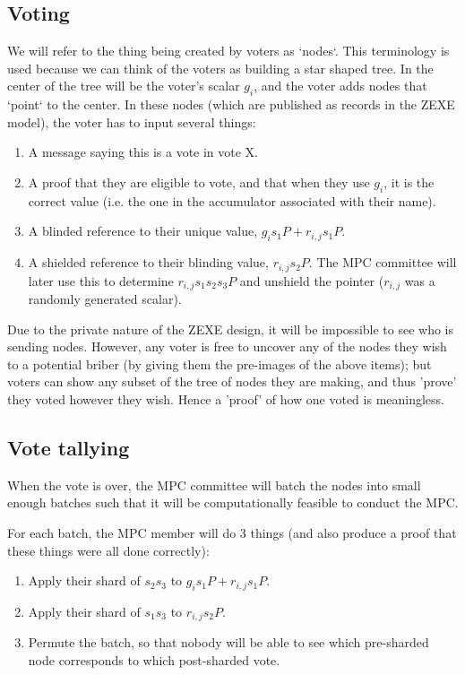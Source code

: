 \documentclass{article}
\begin{document}
\subsection{Voting}
We will refer to the thing being created by voters as `nodes`. This terminology is used because we can think of the voters as building a star shaped tree. In the center of the tree will be the voter's scalar $g_i$, and the voter adds nodes that `point` to the center. In these nodes (which are published as records in the ZEXE model), the voter has to input several things:
\begin{enumerate}
    \item A message saying this is a vote in vote X.
    \item A proof that they are eligible to vote, and that when they use $g_i$, it is the correct value (i.e. the one in the accumulator associated with their name).
    \item A blinded reference to their unique value, $g_is_1P+r_{i,j}s_1P$.
    \item A shielded reference to their blinding value, $r_{i,j}s_2P$. The MPC committee will later use this to determine $r_{i,j}s_1s_2s_3P$ and unshield the pointer ($r_{i,j}$ was a randomly generated scalar).
\end{enumerate}

Due to the private nature of the ZEXE design, it will be impossible to see who is sending nodes. However, any voter is free to uncover any of the nodes they wish to a potential briber (by giving them the pre-images of the above items); but voters can show any subset of the tree of nodes they are making, and thus 'prove' they voted however they wish. Hence a 'proof' of how one voted is meaningless.

\subsection{Vote tallying}
When the vote is over, the MPC committee will batch the nodes into small enough batches such that it will be computationally feasible to conduct the MPC.

For each batch, the MPC member will do 3 things (and also produce a proof that these things were all done correctly):
\begin{enumerate}
    \item Apply their shard of $s_2s_3$ to $g_is_1P+r_{i,j}s_1P$.
    \item Apply their shard of $s_1s_3$ to $r_{i,j}s_2P$.
    \item Permute the batch, so that nobody will be able to see which pre-sharded node corresponds to which post-sharded vote.
\end{enumerate}
\end{document}
